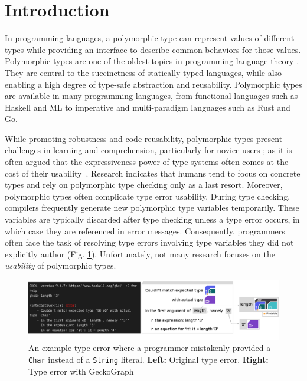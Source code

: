 \documentclass[preprint,12pt]{elsarticle}
\begin{document}
\section{Introduction} \label{sec:intro}
In programming languages, a polymorphic type \cite{Cardelli1987-fp} can represent values of different types while providing an interface to describe common behaviors for those values. Polymorphic types are one of the oldest topics in programming language theory \cite{Cardelli1987-fp}. They are central to the succinctness of statically-typed languages, while also enabling a high degree of type-safe abstraction and reusability. Polymorphic types are available in many programming languages, from functional languages such as Haskell and ML to imperative and multi-paradigm languages such as Rust\cite{Klabnik_undated-wx} and Go\cite{Griesemer_undated-ff}.


While promoting robustness and code reusability, polymorphic types present challenges in learning and comprehension, particularly for novice users \cite{Jun2000-ec, Jun2000-yu}; as it is often argued that the expressiveness power of type systems often comes at the cost of their usability~\cite{Hage2020-hg}. Research indicates that humans tend to focus on concrete types and rely on polymorphic type checking only as a last resort. Moreover, polymorphic types often complicate type error usability. During type checking, compilers frequently generate new polymorphic type variables temporarily. These variables are typically discarded after type checking unless a type error occurs, in which case they are referenced in error messages. Consequently, programmers often face the task of resolving type errors involving type variables they did not explicitly author (Fig. \ref{fig:example-foldable}). Unfortunately, not many research focuses on the \textit{usability} of polymorphic types. 

\begin{figure}[]
  \includegraphics[width=\linewidth]{figures/Foldable}
  \caption{\label{fig:example-foldable} An example type error where a programmer mistakenly provided a \texttt{Char} instead of a \texttt{String} literal. {\bf Left:} Original type error. {\bf Right:} Type error with GeckoGraph}
\end{figure}
\end{document}

